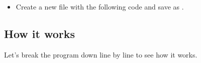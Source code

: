 \documentclass{coderdojo}
\begin{document}
\begin{itemize}
\item[\todoSymbol] \color{todo}
Create a new file with the following code and save as .
\end{itemize}


\subsection{How it works}

Let's break the program down line by line to see how it works.
\end{document}
